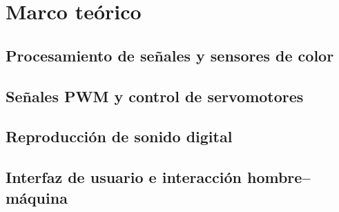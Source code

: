 \section{Marco teórico}

\subsection{Procesamiento de señales y sensores de color}




\subsection{Señales PWM y control de servomotores}



\subsection{Reproducción de sonido digital}




\subsection{Interfaz de usuario e interacción hombre–máquina}



